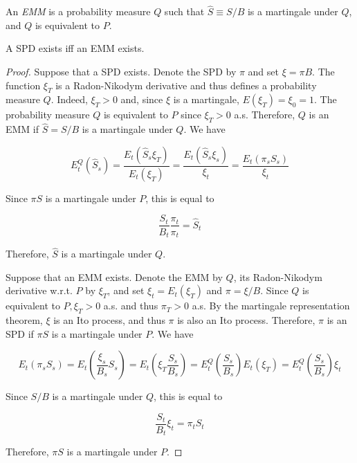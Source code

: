 \documentclass[\topdir/lecture\_notes.tex]{subfiles}
\begin{document}
\begin{defn}\label{def:emm}
An \emph{EMM} is a probability measure \(Q\) such that \(\hat{S} \equiv S / B\) is a martingale under \(Q\), and \(Q\) is equivalent to \(P\).
\end{defn}

\begin{proposition}\label{prop:spd_emm_equivalence}
A SPD exists iff an EMM exists.
\end{proposition}

\begin{proof}
Suppose that a SPD exists. Denote the SPD by \(\pi\) and set \(\xi=\pi B\). The function \(\xi_{T}\) is a Radon-Nikodym derivative and thus defines a probability measure \(Q\). Indeed, \(\xi_{T}>0\) and, since \(\xi\) is a martingale, \(E\left(\xi_{T}\right)=\xi_{0}=1\). The probability measure \(Q\) is equivalent to \(P\) since \(\xi_{T}>0\) a.s. Therefore, \(Q\) is an EMM if \(\hat{S}=S / B\) is a martingale under \(Q\). We have

\begin{equation*}
E_{t}^{Q}\left(\hat{S}_{s}\right)=\frac{E_{t}\left(\hat{S}_{s} \xi_{T}\right)}{E_{t}\left(\xi_{T}\right)}=\frac{E_{t}\left(\hat{S}_{s} \xi_{s}\right)}{\xi_{t}}=\frac{E_{t}\left(\pi_{s} S_{s}\right)}{\xi_{t}}
\end{equation*}

Since \(\pi S\) is a martingale under \(P\), this is equal to

\begin{equation*}
\frac{S_{t}}{B_{t}} \frac{\pi_{t}}{\pi_{t}}=\hat{S}_{t}
\end{equation*}

Therefore, \(\hat{S}\) is a martingale under \(Q\).

Suppose that an EMM exists. Denote the EMM by \(Q\), its Radon-Nikodym derivative w.r.t. \(P\) by \(\xi_{T}\), and set \(\xi_{t}=E_{t}\left(\xi_{T}\right)\) and \(\pi=\xi / B\). Since \(Q\) is equivalent to \(P, \xi_{T}>0\) a.s. and thus \(\pi_{T}>0\) a.s. By the martingale representation theorem, \(\xi\) is an Ito process, and thus \(\pi\) is also an Ito process. Therefore, \(\pi\) is an SPD if \(\pi S\) is a martingale under \(P\). We have

\begin{equation*}
E_{t}\left(\pi_{s} S_{s}\right)=E_{t}\left(\frac{\xi_{s}}{B_{s}} S_{s}\right)=E_{t}\left(\xi_{T} \frac{S_{s}}{B_{s}}\right)=E_{t}^{Q}\left(\frac{S_{s}}{B_{s}}\right) E_{t}\left(\xi_{T}\right)=E_{t}^{Q}\left(\frac{S_{s}}{B_{s}}\right) \xi_{t}
\end{equation*}

Since \(S / B\) is a martingale under \(Q\), this is equal to

\begin{equation*}
\frac{S_{t}}{B_{t}} \xi_{t}=\pi_{t} S_{t}
\end{equation*}

Therefore, \(\pi S\) is a martingale under \(P\).
\end{proof}
\end{document}
